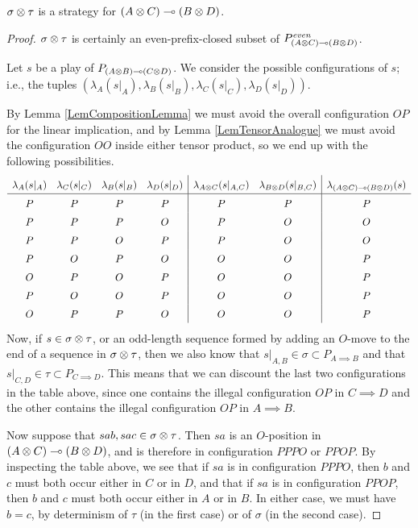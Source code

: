 \documentclass[11pt]{report}
\begin{document}
\begin{proposition}
  $\sigma\otimes\tau$ is a strategy for $(A\otimes C)\multimap (B\otimes D)$.
  \label{PropTensorWellDefined}
\end{proposition}
\begin{proof}
  $\sigma\otimes\tau$ is certainly an even-prefix-closed subset of $P_{(A\otimes C)\multimap (B\otimes D)}^{\textit{even}}$.  

  Let $s$ be a play of $P_{(A\otimes B)\multimap (C\otimes D)}$.  
  We consider the possible configurations of $s$; i.e., the tuples $(\lambda_A(s\vert_A),\lambda_B(s\vert_B),\lambda_C(s\vert_C),\lambda_D(s\vert_D))$.

  By Lemma \ref{LemCompositionLemma} we must avoid the overall configuration $OP$ for the linear implication, and by Lemma \ref{LemTensorAnalogue} we must avoid the configuration $OO$ inside either tensor product, so we end up with the following possibilities.
  \scriptsize
  \[
\arraycolsep=4.8pt\def\arraystretch{1.5}
    \begin{array}{cccc|cc|c}
      \lambda_A(s\vert_A) & \lambda_C(s\vert_C) & \lambda_B(s\vert_B) & \lambda_D(s\vert_D) & \lambda_{A\tensor C}(s\vert_{A,C}) & \lambda_{B\tensor D}(s\vert_{B,C}) & \lambda_{(A\tensor C)\implies (B\tensor D)}(s) \\
      \hline
      P & P & P & P & P & P & P \\
      P & P & P & O & P & O & O \\
      P & P & O & P & P & O & O \\
      P & O & P & O & O & O & P \\
      O & P & O & P & O & O & P \\
      P & O & O & P & O & O & P \\
      O & P & P & O & O & O & P \\
    \end{array}
    \]
  \normalsize
  Now, if $s\in\sigma\otimes\tau$, or an odd-length sequence formed by adding an $O$-move to the end of a sequence in $\sigma\otimes\tau$, then we also know that $s\vert_{A,B}\in\sigma\subset P_{A\implies B}$ and that $s\vert_{C,D}\in\tau\subset P_{C\implies D}$.  
  This means that we can discount the last two configurations in the table above, since one contains the illegal configuration $OP$ in $C\implies D$ and the other contains the illegal configuration $OP$ in $A \implies B$.

  Now suppose that $sab,sac\in\sigma\otimes\tau$.  
  Then $sa$ is an $O$-position in $(A\otimes C)\multimap (B\otimes D)$, and is therefore in configuration $PPPO$ or $PPOP$.  
  By inspecting the table above, we see that if $sa$ is in configuration $PPPO$, then $b$ and $c$ must both occur either in $C$ or in $D$, and that if $sa$ is in configuration $PPOP$, then $b$ and $c$ must both occur either in $A$ or in $B$.  
  In either case, we must have $b=c$, by determinism of $\tau$ (in the first case) or of $\sigma$ (in the second case).
\end{proof}
\end{document}
